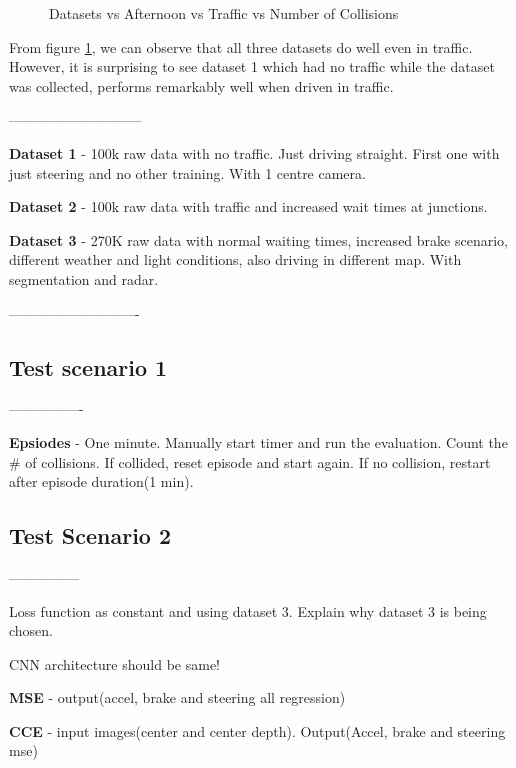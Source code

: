 \begin{figure}
	\centering
    \def\svgwidth{0.6\textwidth}
    \caption{Datasets vs Afternoon vs Traffic vs Number of Collisions}
    \label{fig:dsvslcvstrafficncolsetup2}
\end{figure}
From figure \ref{fig:dsvslcvstrafficncolsetup2}, we can observe that all three datasets do
well even in traffic. However, it is surprising to see dataset 1 which had no traffic
while the dataset was collected, performs remarkably well when driven in traffic.



\iffalse
-----------------------------

\textbf{Dataset 1} - 100k raw data with no traffic. Just driving straight. First one with just steering and no other training.  With 1 centre camera.

\textbf{Dataset 2} - 100k raw data with traffic and increased wait times at junctions.

\textbf{Dataset 3} - 270K raw data with normal waiting times, increased brake scenario, different weather and light conditions, also driving in different map. With segmentation and radar.

----------------------------

\subsection{Test scenario 1}

----------------

\textbf{Epsiodes} - One minute. Manually start timer and run the evaluation. Count the \# of collisions. If collided, reset episode and start again. If no collision, restart after episode duration(1 min).


\subsection{Test Scenario 2}

---------------

Loss function as constant and using dataset 3. Explain why dataset 3 is being chosen.

CNN architecture should be same!

\textbf{MSE} - output(accel, brake and steering all regression)

\textbf{CCE} - input images(center and center depth). Output(Accel, brake and steering mse)


